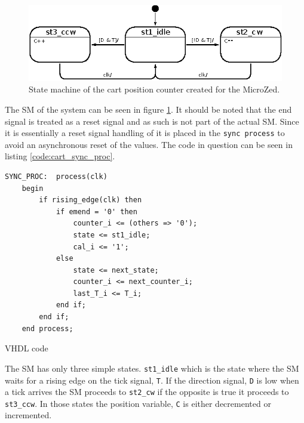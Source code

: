 \begin{figure}[h]
	\centering
	\includegraphics[width=.75\linewidth]{graphics/count_state_machine}
	\caption{State machine of the cart position counter created for the MicroZed.}
	\label{fig:countstatemachine}
\end{figure}

The SM of the system can be seen in figure \ref{fig:countstatemachine}.
It should be noted that the end signal is treated as a reset signal and as such is not part of the actual SM.
Since it is essentially a reset signal handling of it is placed in the \texttt{sync process} to avoid an asynchronous reset of the values.
The code in question can be seen in listing \ref{code:cart_sync_proc}.

\begin{listing}[h]
\begin{verbatim}
SYNC_PROC:  process(clk)
	begin
	    if rising_edge(clk) then
	        if emend = '0' then
	            counter_i <= (others => '0');
	            state <= st1_idle;
	            cal_i <= '1';
	        else
	            state <= next_state;
	            counter_i <= next_counter_i;
	            last_T_i <= T_i;
	        end if;
	    end if;
	end process;
\end{verbatim}
\caption{VHDL code}
\label{code:cart_sync_proc}
\end{listing}

The SM has only three simple states.
\texttt{st1\_idle} which is the state where the SM waits for a rising edge on the tick signal, \texttt{T}.
If the direction signal, \texttt{D} is low when a tick arrives the SM proceeds to \texttt{st2\_cw} if the opposite is true it proceeds to \texttt{st3\_ccw}.
In those states the position variable, \texttt{C} is either decremented or incremented.

